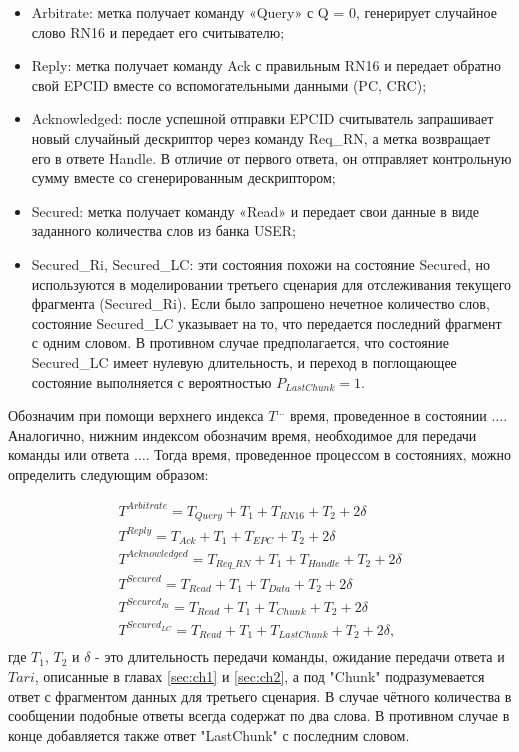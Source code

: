 \documentclass[12pt]{article}
\theoremstyle{definition}
\begin{document}
\begin{itemize}
    \item Arbitrate: метка получает команду «Query» с Q = 0, генерирует случайное слово RN16 и передает его считывателю;
    \item Reply: метка получает команду Ack с правильным RN16 и передает обратно свой EPCID вместе со вспомогательными данными (PC, CRC);
    \item Acknowledged: после успешной отправки EPCID считыватель запрашивает новый случайный дескриптор через команду Req\_RN, а метка возвращает его в ответе Handle. В отличие от первого ответа, он отправляет контрольную сумму вместе со сгенерированным дескриптором;
    \item Secured: метка получает команду «Read» и передает свои данные в виде заданного количества слов из банка USER;
    \item Secured\_{Ri}, Secured\_{LC}: эти состояния похожи на состояние Secured, но используются в моделировании третьего сценария для отслеживания текущего фрагмента (Secured\_{Ri}). Если было запрошено нечетное количество слов, состояние Secured\_{LC} указывает на то, что передается последний фрагмент с одним словом. В противном случае предполагается, что состояние Secured\_{LC} имеет нулевую длительность, и переход в поглощающее состояние выполняется с вероятностью $P_{LastChunk}=1$.
\end{itemize}

Обозначим при помощи верхнего индекса $T^{\ldots}$ время, проведенное в состоянии $\ldots$. Аналогично, нижним индексом обозначим время, необходимое для передачи команды или ответа $\ldots$. Тогда время, проведенное процессом в состояниях, можно определить следующим образом:

\begin{equation}
  \begin{gathered}
    T^{Arbitrate} = T_{Query} + T_1 + T_{RN16} + T_2 + 2\delta \\
    T^{Reply} = T_{Ack} + T_1 + T_{EPC} + T_2 + 2\delta \\
    T^{Acknowledged} = T_{Req\_RN} + T_1 + T_{Handle} + T_2 + 2\delta \\
    T^{Secured} = T_{Read} + T_1 + T_{Data} + T_2 + 2\delta \\
    T^{Secured_{Ri}} = T_{Read} + T_1 + T_{Chunk} + T_2 + 2\delta \\
    T^{Secured_{LC}} = T_{Read} + T_1 + T_{LastChunk} + T_2 + 2\delta, \\
    \end{gathered}
\end{equation}
где $T_1$, $T_2$ и $\delta$ - это длительность передачи команды, ожидание передачи ответа и $Tari$, описанные в главах \ref{sec:ch1} и \ref{sec:ch2}, а под "Chunk" подразумевается ответ с фрагментом данных для третьего сценария. В случае чётного количества в сообщении подобные ответы всегда содержат по два слова. В противном случае в конце добавляется также ответ "LastChunk" с последним словом.
\end{document}
